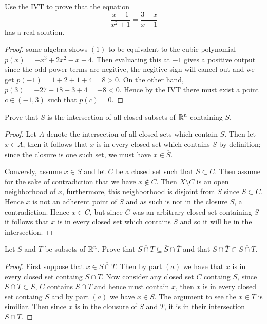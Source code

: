 

 
\question
Use the IVT to prove that the equation 
\begin{equation} 
\frac{x-1}{x^2 + 1} = \frac{3-x}{x+1}
\end{equation}
has a real solution. 

\begin{proof}
	some algebra shows $(1)$ to be equivalent to the cubic polynomial $p(x) = -x^3 + 2x^2 - x + 4$. Then evaluating this at $-1$ gives a positive output since the odd power terms are negitive, the negitive sign will cancel out and we get $p(-1) = 1 + 2 + 1 + 4 = 8 >0$. On the other hand, $p(3) = -27 + 18 - 3 + 4 =  -8 < 0$. Hence by the IVT there must exist a point $c \in (-1, 3)$ such that $p(c) = 0$.
\end{proof}
\question
\begin{alphaparts} 
\questionpart 
Prove that $\overline{S}$ is the intersection of all closed subsets of $\mathbb{R}^n$ containing $S$. 

\begin{proof}
Let $A$ denote the intersection of all closed sets which contain $S$. 
Then let $x \in A$, then it follows that $x$ is in every closed set which contains $S$ by definition; since the closure is one such set, we must have $x \in \overline{S}$. 

Conversly, assume $x \in \overline{S}$ and let $C$ be a closed set such that $S \subset C$. Then assume for the sake of contradiction that we have $x \notin C$. Then $X \setminus C$ is an open neighborhood of $x$, furthermore, this neighborhood is disjoint from $S$ since $S \subset C$. Hence $x$ is not an adherent point of $S$ and as such is not in the closure $\overline{S}$, a contradiction. Hence $x \in C$, but since $C$ was an arbitrary closed set containing $S$ it follows that $x$ is in every closed set which contains $S$ and so it will be in the intersection.
\end{proof}
\questionpart 
Let $S$ and $T$ be subsets of $\mathbb{R}^n$. Prove that $\overline{S \cap T} \subseteq \overline{S} \cap \overline{T}$ and that $S \cap \overline{T} \subset \overline{S \cap T}$. 

\begin{proof}
First suppose that $x \in \overline{S \cap T}$. Then by part $(a)$ we have that $x$ is 
in every closed set containg $S \cap T$. Now consider any closed set $C$ containg $S$, since $S \cap T \subset S$, $C$ contains $S \cap T$ and hence must contain $x$, then 
$x$ is in every closed set containg $S$ and by part $(a)$ we have $x \in \overline{S}$.
The argument to see the $x \in \overline{T}$ is similiar. Then since $x$ is in the clousure of $S$ and $T$, it is in their intersection $\overline{S} \cap \overline{T}$. 


\end{proof}
\end{alphaparts}
